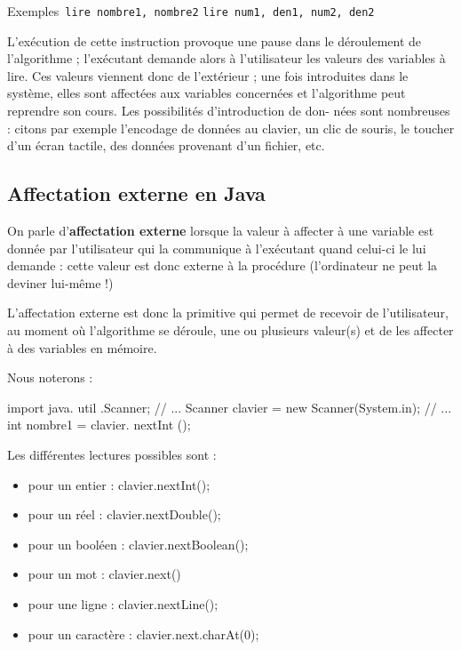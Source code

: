 \documentclass[11pt,a4paper]{article}
\begin{document}
          Exemples
          \,\verb|lire nombre1, nombre2|\,\,\verb|lire num1, den1, num2, den2|\,
            \par
        
          L'ex\'ecution de cette instruction provoque une pause dans le d\'eroulement de l'algorithme ;
          l'ex\'ecutant demande alors \`a l'utilisateur les valeurs des variables \`a lire. Ces valeurs viennent
          donc de l'ext\'erieur ; une fois introduites dans le syst\`eme, elles sont affect\'ees aux variables
          concern\'ees et l'algorithme peut reprendre son cours. Les possibilit\'es d'introduction de don-
          n\'ees sont nombreuses : citons par exemple l'encodage de donn\'ees au clavier, un clic de souris,
          le toucher d'un \'ecran tactile, des donn\'ees provenant d'un fichier, etc.
        
            \par
        \subsection{Affectation externe en Java}
          On parle d'\textbf{affectation externe} lorsque la valeur \`a affecter \`a une variable
           est donn\'ee par l'utilisateur qui la communique \`a l'ex\'ecutant quand celui-ci le lui demande : cette valeur est
          donc externe \`a la proc\'edure (l'ordinateur ne peut la deviner lui-m\^eme !)
        
            \par
        
          L'affectation externe est donc la primitive qui permet de recevoir de l'utilisateur, au moment
          o\`u l'algorithme se d\'eroule, une ou plusieurs valeur(s) et de les affecter \`a des variables en
          m\'emoire. 
        
            \par
        
          Nous noterons :
          
            \par
        \begin{Java}
 import java. util .Scanner;
// ...
Scanner clavier = new Scanner(System.in);
// ...
int nombre1 = clavier. nextInt ();
				\end{Java}
          Les diff\'erentes lectures possibles sont :
          
					\begin{itemize}
				
			\item pour un entier : clavier.nextInt();
			\item pour un r\'eel : clavier.nextDouble();
			\item pour un bool\'een : clavier.nextBoolean();
			\item pour un mot : clavier.next()
			\item pour une ligne : clavier.nextLine();
			\item pour un caract\`ere : clavier.next.charAt(0);
					\end{itemize}
				
\end{document}
